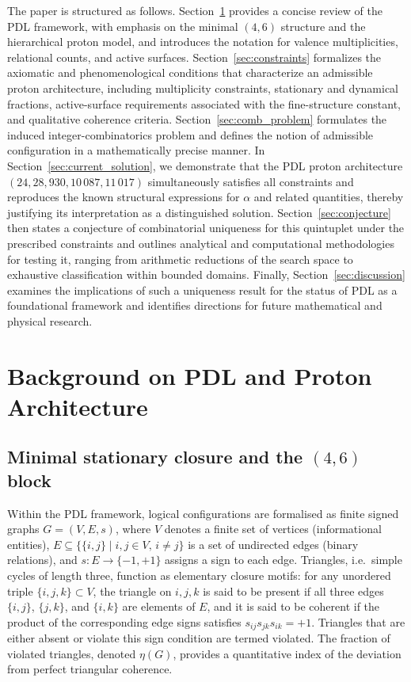\documentclass[11pt,a4paper]{article}
\begin{document}
The paper is structured as follows. Section~\ref{sec:background} provides a concise review of the PDL framework, with emphasis on the minimal $(4,6)$ structure and the hierarchical proton model, and introduces the notation for valence multiplicities, relational counts, and active surfaces. Section~\ref{sec:constraints} formalizes the axiomatic and phenomenological conditions that characterize an admissible proton architecture, including multiplicity constraints, stationary and dynamical fractions, active-surface requirements associated with the fine-structure constant, and qualitative coherence criteria. Section~\ref{sec:comb_problem} formulates the induced integer-combinatorics problem and defines the notion of admissible configuration in a mathematically precise manner. In Section~\ref{sec:current_solution}, we demonstrate that the PDL proton architecture $(24,28,930,10\,087,11\,017)$ simultaneously satisfies all constraints and reproduces the known structural expressions for $\alpha$ and related quantities, thereby justifying its interpretation as a distinguished solution. Section~\ref{sec:conjecture} then states a conjecture of combinatorial uniqueness for this quintuplet under the prescribed constraints and outlines analytical and computational methodologies for testing it, ranging from arithmetic reductions of the search space to exhaustive classification within bounded domains. Finally, Section~\ref{sec:discussion} examines the implications of such a uniqueness result for the status of PDL as a foundational framework and identifies directions for future mathematical and physical research.

\section{Background on PDL and Proton Architecture}
\label{sec:background}

\subsection{Minimal stationary closure and the \texorpdfstring{$(4,6)$}{(4,6)} block}
Within the PDL framework, logical configurations are formalised as finite signed graphs $G=(V,E,s)$, where $V$ denotes a finite set of vertices (informational entities), $E \subseteq \{\{i,j\} \mid i,j \in V,\, i\neq j\}$ is a set of undirected edges (binary relations), and $s:E\to\{-1,+1\}$ assigns a sign to each edge.\cite{LaubscherIntroPDL2026,LaubscherPDLFull2026} Triangles, i.e.\ simple cycles of length three, function as elementary closure motifs: for any unordered triple $\{i,j,k\}\subset V$, the triangle on $i,j,k$ is said to be present if all three edges $\{i,j\}$, $\{j,k\}$, and $\{i,k\}$ are elements of $E$, and it is said to be coherent if the product of the corresponding edge signs satisfies $s_{ij}s_{jk}s_{ik}=+1$.\cite{LaubscherPDLFull2026,LaubscherLDP2026} Triangles that are either absent or violate this sign condition are termed violated. The fraction of violated triangles, denoted $\eta(G)$, provides a quantitative index of the deviation from perfect triangular coherence.\cite{LaubscherPDLFull2026}
\end{document}
